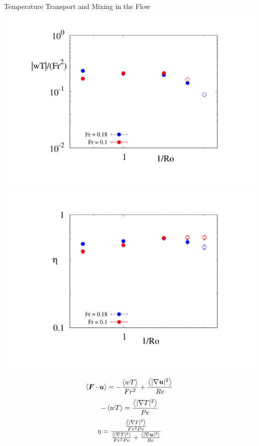 \documentclass[aspecttatio=169]{beamer}
\begin{document}

\begin{frame}{Temperature Transport and Mixing in the Flow}
        \centering
        \includegraphics[width=1\textwidth]{images/bflux_plot.pdf}
    \emp
        \centering
        \includegraphics[width=.91\textwidth]{images/mixing_plot.pdf}
    \emp

    \vspace{10pt}

        \[\left< \bs{F}\cdot \uvec\right> = -\frac{\left<wT\right>}{Fr^2} +
        \frac{\left<|\grad \uvec|^2\right>}{Re}\]
        \[ -\left<wT\right> = \frac{\left<|\grad T|^2\right>}{Pe}\]
    \emp
         \[\eta = \frac{\frac{\left<|\grad
         T|^2\right>}{Fr^2Pe}}{\frac{\left<|\grad T|^2\right>}{Fr^2Pe} +
        \frac{\left<|\grad \uvec|^2\right>}{Re}}
        \]
    \emp
\end{frame}
\end{document}
